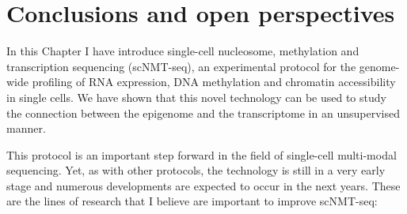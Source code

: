 \section{Conclusions and open perspectives}

In this Chapter I have introduce single-cell nucleosome, methylation and transcription sequencing (scNMT-seq), an experimental protocol for the genome-wide profiling of RNA expression, DNA methylation and chromatin accessibility in single cells. We have shown that this novel technology can be used to study the connection between the epigenome and the transcriptome in an unsupervised manner.

This protocol is an important step forward in the field of single-cell multi-modal sequencing. Yet, as with other protocols, the technology is still in a very early stage and numerous developments are expected to occur in the next years. These are the lines of research that I believe are important to improve scNMT-seq:

